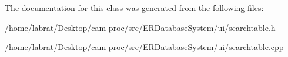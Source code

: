 The documentation for this class was generated from the following files\+:\begin{DoxyCompactItemize}
\item 
/home/labrat/\+Desktop/cam-\/proc/src/\+E\+R\+Database\+System/ui/searchtable.\+h\item 
/home/labrat/\+Desktop/cam-\/proc/src/\+E\+R\+Database\+System/ui/searchtable.\+cpp\end{DoxyCompactItemize}
